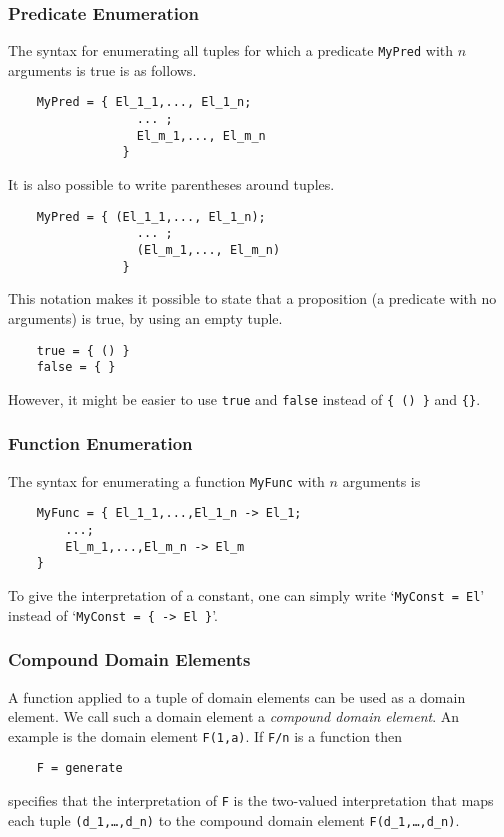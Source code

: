 \documentclass[a4]{article}
\newcommand{\code}[1]{{\tt #1}}
\begin{document}
\subsubsection{Predicate Enumeration}
The syntax for enumerating all tuples for which a predicate {\tt MyPred} with $n$ arguments is true is as follows.
\begin{lstlisting}
	MyPred = { El_1_1,..., El_1_n; 
				  ... ; 
				  El_m_1,..., El_m_n 
				}
\end{lstlisting}

It is also possible to write parentheses around tuples.
\begin{lstlisting}
	MyPred = { (El_1_1,..., El_1_n); 
				  ... ; 
				  (El_m_1,..., El_m_n) 
				}
\end{lstlisting}
This notation makes it possible to state that a proposition (a predicate with no arguments) is true, by using an empty tuple.
\begin{lstlisting}
	true = { () }
	false = { }
\end{lstlisting}
However, it might be easier to use \code{true} and \code{false} instead of \code{\{ () \}} and \code{\{\}}.

\subsubsection{Function Enumeration}
The syntax for enumerating a function {\tt MyFunc} with $n$ arguments is 
\begin{lstlisting}
	MyFunc = { El_1_1,...,El_1_n -> El_1;
		...;
		El_m_1,...,El_m_n -> El_m
	}
\end{lstlisting}
To give the interpretation of a constant, one can simply write `{\tt MyConst = El}' instead of `{\tt MyConst = \{ -> El \}}'.

\subsubsection{Compound Domain Elements}
A function applied to a tuple of domain elements can be used as a domain element.  We call such a domain element a \textit{compound domain element}.  An example is the domain element \code{F(1,a)}. If \code{F/n} is a function then 
\begin{lstlisting}
	F = generate
\end{lstlisting}
specifies that the interpretation of \code{F} is the two-valued interpretation that maps each tuple \code{(d\_1,\ldots,d\_n)} to the compound domain element \code{F(d\_1,\ldots,d\_n)}.
\end{document}
